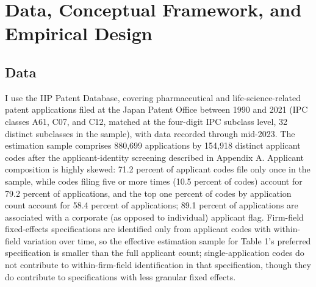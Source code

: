 \documentclass[12pt]{article}
\begin{document}
\section{Data, Conceptual Framework, and Empirical Design}

\subsection{Data}

I use the IIP Patent Database, covering pharmaceutical and life-science-related patent applications filed at the Japan Patent Office between 1990 and 2021 (IPC classes A61, C07, and C12, matched at the four-digit IPC subclass level, 32 distinct subclasses in the sample), with data recorded through mid-2023. The estimation sample comprises 880,699 applications by 154,918 distinct applicant codes after the applicant-identity screening described in Appendix A. Applicant composition is highly skewed: 71.2 percent of applicant codes file only once in the sample, while codes filing five or more times (10.5 percent of codes) account for 79.2 percent of applications, and the top one percent of codes by application count account for 58.4 percent of applications; 89.1 percent of applications are associated with a corporate (as opposed to individual) applicant flag. Firm-field fixed-effects specifications are identified only from applicant codes with within-field variation over time, so the effective estimation sample for Table 1's preferred specification is smaller than the full applicant count; single-application codes do not contribute to within-firm-field identification in that specification, though they do contribute to specifications with less granular fixed effects.
\end{document}
